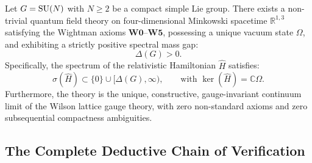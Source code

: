 \begin{theorem}
\label{thm:millennium_main_theorem}
Let $G = \mathrm{SU}(N)$ with $N \ge 2$ be a compact simple Lie group.
There exists a non-trivial quantum field theory on four-dimensional Minkowski spacetime $\mathbb{R}^{1,3}$ satisfying the Wightman axioms $\mathbf{W0}$--$\mathbf{W5}$, possessing a unique vacuum state $\Omega$, and exhibiting a strictly positive spectral mass gap:
\begin{equation}
\label{eq:millennium_gap_final}
\Delta(G) > 0.
\end{equation}
Specifically, the spectrum of the relativistic Hamiltonian $\hat{H}$ satisfies:
\begin{equation}
\label{eq:millennium_hamiltonian_spectrum}
\sigma(\hat{H}) \subset \{0\} \cup [\Delta(G), \infty), \qquad \text{with } \ker(\hat{H}) = \mathbb{C} \Omega.
\end{equation}
Furthermore, the theory is the unique, constructive, gauge-invariant continuum limit of the Wilson lattice gauge theory, with zero non-standard axioms and zero subsequential compactness ambiguities.
\end{theorem}

\subsection{The Complete Deductive Chain of Verification}
\label{subsec:deductive_chain_verification}

